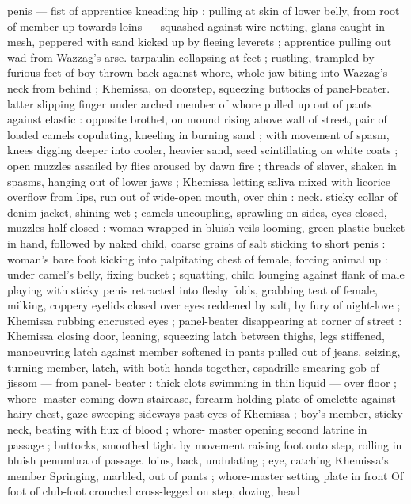 penis --- fist of apprentice kneading hip : pulling at skin of lower 
belly, from root of member up towards loins --- squashed against 
wire netting, glans caught in mesh, peppered with sand kicked up by 
fleeing leverets ; apprentice pulling out wad from Wazzag's arse. 
tarpaulin collapsing at feet ; rustling, trampled by furious feet of boy 
thrown back against whore, whole jaw biting into Wazzag's neck from 
behind ; Khemissa, on doorstep, squeezing buttocks of panel-beater. 
latter slipping finger under arched member of whore pulled up out of 
pants against elastic : opposite brothel, on mound rising above wall 
of street, pair of loaded camels copulating, kneeling in burning sand 
; with movement of spasm, knees digging deeper into cooler, heavier 
sand, seed scintillating on white coats ; open muzzles assailed by 
flies aroused by dawn fire ; threads of slaver, shaken in spasms, 
hanging out of lower jaws ; Khemissa letting saliva mixed with licorice 
overflow from lips, run out of wide-open mouth, over chin : neck. 
sticky collar of denim jacket, shining wet ; camels uncoupling, 
sprawling on sides, eyes closed, muzzles half-closed : woman 
wrapped in bluish veils looming, green plastic bucket in hand, 
followed by naked child, coarse grains of salt sticking to short penis 
: woman's bare foot kicking into palpitating chest of female, forcing 
animal up : under camel's belly, fixing bucket ; squatting, child 
lounging against flank of male playing with sticky penis retracted 
into fleshy folds, grabbing teat of female, milking, coppery eyelids 
closed over eyes reddened by salt, by fury of night-love ; Khemissa 
rubbing encrusted eyes ; panel-beater disappearing at corner of 
street : Khemissa closing door, leaning, squeezing latch between 
thighs, legs stiffened, manoeuvring latch against member softened in 
pants pulled out of jeans, seizing, turning member, latch, with both 
hands together, espadrille smearing gob of jissom --- from panel- 
beater : thick clots swimming in thin liquid --- over floor ; whore- 
master coming down staircase, forearm holding plate of omelette 
against hairy chest, gaze sweeping sideways past eyes of Khemissa 
; boy's member, sticky neck, beating with flux of blood ; whore- 
master opening second latrine in passage ; buttocks, smoothed tight 
by movement raising foot onto step, rolling in bluish penumbra of 
passage. loins, back, undulating ; eye, catching Khemissa's member 
Springing, marbled, out of pants ; whore-master setting plate in front 
Of foot of club-foot crouched cross-legged on step, dozing, head 
